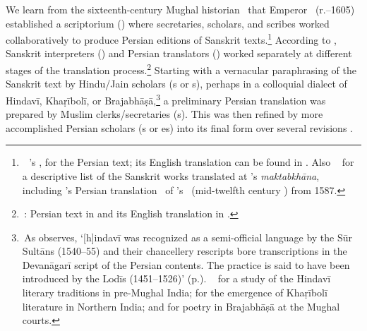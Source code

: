 We learn from the sixteenth-century Mughal historian \Badaunifull\ that Emperor \Akbar\ (r.--1605) established a scriptorium  (\maktabkhana) where secretaries, scholars, and scribes worked collaboratively to produce Persian editions of Sanskrit texts.\footnote{\,\Vid\ \Badauni's \MuntakhabalTawarikh, \textcite[Vol.\thinspace II, p.]{Lees} for the Persian text; its English translation can be found in \textcite[Vol.\thinspace II, p.]{Lowe}. Also \vid\ \textcite[Chapter~6, pp.--222]{Rizvi} for a descriptive list of the Sanskrit works translated at \Akbar's \textit{maktabkhāna}, including \AbualFaydi's Persian translation \TarjumayiLilawati\ of \BhaskaraII's \Lilavati\ (\circa mid-twelfth century \ce) from 1587.} According to \Badauni, Sanskrit interpreters (\muabbiran) and Persian translators (\mutarjiman) worked separately at different stages of the translation process.\footnote{\,\MuntakhabalTawarikh: Persian text in \textcite[Vol~II, pp.--321]{Lees} and its English translation in \textcite[Vol.\thinspace II, pp.--330]{Lowe}.} Starting with a vernacular paraphrasing of the Sanskrit text by Hindu/Jain scholars (\pandita s or \sastrin s), perhaps in a colloquial dialect of Hindavī, Khaṛībolī, or Braja\-bhāṣā,\footnote{\,As \textcite{AlamPersian1998} observes, `[h]indavī was recognized as a semi-official language by the Sūr Sultāns (1540--55) and their chancellery rescripts bore transcriptions in the Devanāgarī script of the Persian contents. The practice is said to have been introduced by the Lodīs (1451--1526)' (p.). \Vid\ \textcite{Behl2012} for a study of the Hindavī literary traditions in pre-Mughal India; \textcite{Imre} for the emergence of Khaṛībolī literature in Northern India; and \textcite{Busch} for poetry in Braja\-bhāṣā at the Mughal courts.} a preliminary Persian translation was prepared by Muslim clerks/secretaries (\muharrir s). This was then refined by more accomplished Persian scholars (\ustadh s or \mutamarris es) into its final form over several revisions \parencite[564--566]{Hodivala}. 

